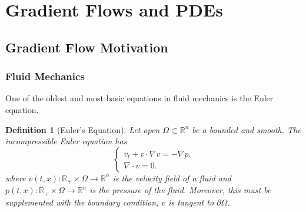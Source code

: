 \documentclass[12pt]{article}
\newcommand{\R}{\mathbb{R}}
\theoremstyle{plain}
\newtheorem{defn}{Definition}[section]
\numberwithin{equation}{section}
\begin{document}
\section{Gradient Flows and PDEs}
\subsection{Gradient Flow Motivation}
\subsubsection{Fluid Mechanics}
One of the oldest and most basic equations in fluid mechanics is the Euler equation. 
\begin{defn}[Euler's Equation]
  Let open $\Omega\subset\R^n$ be a bounded and smooth. The incompressible Euler equation has
  \begin{equation}
    \begin{cases}
      v_t + v \cdot \nabla v = - \nabla p. \\
      \nabla \cdot v = 0.
    \end{cases}
  \end{equation}
  where $v(t,x): \R_+ \times \Omega \to \R^n$ is the velocity field of a fluid and $p(t,x):\R_+\times \Omega \to \R^n$ is the pressure of the fluid. Moreover, this must be supplemented with the boundary condition, $v$ is tangent to $\partial \Omega$.
\end{defn}
\end{document}
